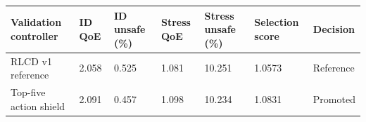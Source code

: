 \begin{tabular}{lllllll}
\toprule
Validation controller & ID QoE & ID unsafe (\%) & Stress QoE & Stress unsafe (\%) & Selection score & Decision \\
\midrule
RLCD v1 reference & 2.058 & 0.525 & 1.081 & 10.251 & 1.0573 & Reference \\
Top-five action shield & 2.091 & 0.457 & 1.098 & 10.234 & 1.0831 & Promoted \\
\bottomrule
\end{tabular}
